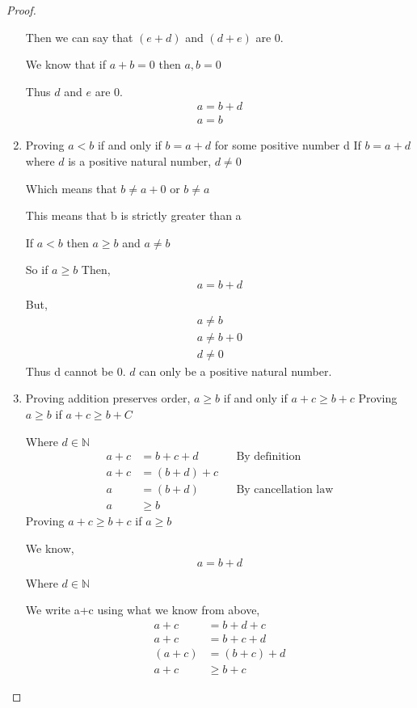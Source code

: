 \documentclass[11pt]{report}
\begin{document}
\begin{proof}
\begin{enumerate}
		      Then we can say that $(e+d)$ and $(d+e)$ are 0.

		      We know that if $a + b = 0$ then $a,b = 0$

		      Thus $d$ and $e$ are 0.
		      \begin{align*}
			      a = b + d \\
			      a = b
		      \end{align*}
		\item Proving $a < b$ if and only if $b =a+d$ for some positive number d
		      If $b = a+d$ where $d$ is a positive natural number, $d \neq 0$

		      Which means that $b \neq a + 0$ or $b \neq a$

		      This means that b is strictly greater than a

		      If $a<b$ then $a \geq b$ and $a \neq b$

		      So if $a \geq b$
		      Then,
		      \begin{align*}
			      a = b + d \\
		      \end{align*}
		      But,
		      \begin{align*}
			      a \neq b     \\
			      a \neq b + 0 \\
			      d \neq 0
		      \end{align*}
		      Thus d cannot be 0. $d$ can only be a positive natural number.
		\item Proving addition preserves order, $a \geq b$ if and only if $a + c \geq b + c$
		      Proving $a \geq b$ if $a + c \geq b + C$

		      Where $d \in \mathbb{N}$
		      \begin{align*}
			      a + c & = b + c + d &   & \text{By definition}       \\
			      a + c & = (b+d) + c &                                \\
			      a     & = (b+d)     &   & \text{By cancellation law} \\
			      a     & \geq b
		      \end{align*}
		      Proving $a + c \geq b +c$ if $a \geq b$

		      We know,
		      \begin{align*}
			      a = b + d \\
		      \end{align*}
		      Where $d \in \mathbb{N}$

		      We write a+c using what we know from above,
		      \begin{align*}
			      a + c   & = b + d + c   \\
			      a + c   & = b + c + d   \\
			      (a + c) & = (b + c) + d \\
			      a + c   & \geq b + c
		      \end{align*}


\end{enumerate}
\end{proof}
\end{document}
